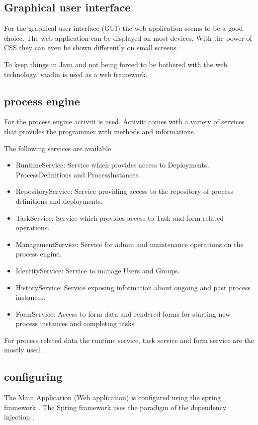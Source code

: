 \documentclass[paper=a4,twoside=false,BCOR=0mm,DIV=calc,fontsize=12pt]{scrartcl}
\begin{document}
\subsection{Graphical user interface}
For the graphical user interface (GUI) the web application seems to be a good choice. The web application can be displayed on most devices. With the power of CSS \cite{css} they can even be shown differently on small screens.

To keep things in Java and not being forced to be bothered with the web technology, vaadin \cite{vaadin} is used as a web framework.


\subsection{process engine}
For the process engine activiti is used. Activiti comes with a variety of services that provides the programmer with methods and informations.

The following services are available \cite{activitijavadoc}
\begin{itemize}
 \item RuntimeService: Service which provides access to Deployments, ProcessDefinitions and ProcessInstances. 
 \item RepositoryService: Service providing access to the repository of process definitions and deployments. 
 \item TaskService: Service which provides access to Task and form related operations. 
 \item ManagementService: Service for admin and maintenance operations on the process engine. 
 \item IdentityService: Service to manage Users and Groups. 
 \item HistoryService: Service exposing information about ongoing and past process instances. 
 \item FormService: Access to form data and rendered forms for starting new process instances and completing tasks
\end{itemize}

For process related data the runtime service, task service and form service are the mostly used.


\subsection{configuring}
The Main Application (Web application) is configured using the spring framework \cite{spring}. The Spring framework uses the paradigm of the dependency injection \cite{dependencyInection}.
\end{document}
